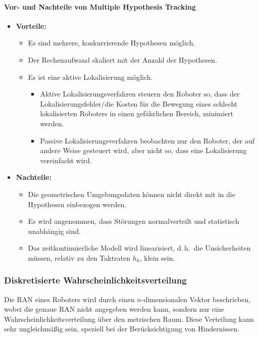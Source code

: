 \documentclass[a4paper, 11pt, accentcolor = tud3b]{tudreport}
\renewcommand{\dh}{d.\,h.~}
\begin{document}
					\paragraph{Vor- und Nachteile von Multiple Hypothesis Tracking}
						\begin{itemize}
							\item \textbf{Vorteile:}
								\begin{itemize}
									\item Es sind mehrere, konkurrierende Hypothesen möglich.
									\item Der Rechenaufwand skaliert mit der Anzahl der Hypothesen.
									\item Es ist eine aktive Lokalisierung möglich.
										\begin{itemize}
											\item Aktive Lokalisierungsverfahren steuern den Roboter so, dass der Lokalisierungsfehler/die Kosten für die Bewegung eines schlecht lokalisierten Roboters in einen gefährlichen Bereich, minimiert werden.
											\item Passive Lokalisierungsverfahren beobachten nur den Roboter, der auf andere Weise gesteuert wird, aber nicht so, dass eine Lokalisierung vereinfacht wird.
										\end{itemize}
								\end{itemize}
							\item \textbf{Nachteile:}
								\begin{itemize}
									\item Die geometrischen Umgebungsdaten können nicht direkt mit in die Hypothesen einbezogen werden.
									\item Es wird angenommen, dass Störungen normalverteilt und statistisch unabhängig sind.
									\item Das zeitkontinuierliche Modell wird linearisiert, \dh die Unsicherheiten müssen, relativ zu den Taktraten \( h_k \), klein sein.
								\end{itemize}
						\end{itemize}

				\subsubsection{Diskretisierte Wahrscheinlichkeitsverteilung}
					Die RAN eines Roboters wird durch einen \(n\)-dimensionalen Vektor beschrieben, wobei die genaue RAN nicht angegeben werden kann, sondern nur eine Wahrscheinlichkeitsverteilung über den metrischen Raum. Diese Verteilung kann sehr ungleichmäßig sein, speziell bei der Berücksichtigung von Hindernissen.
					
\end{document}
